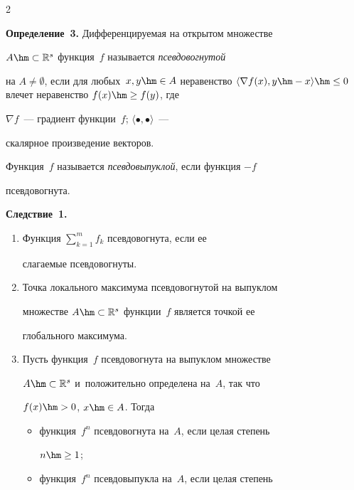 \begin{multicols}{2}
  


  \noindent


  \textbf{Определение~3.} Дифференцируемая на открытом множестве 


$A\hm\subset \mathbb{R}^s$ функция~$f$ называется \textit{псевдовогнутой} 


на $A\not= \emptyset$, если для любых~$x,y \hm\in A$ неравенство $\langle 


\nabla f(x), y\hm- x\rangle \hm\leq 0$ влечет неравенство $f(x)\hm\geq f(y)$, где 


$\nabla f$~--- градиент функции~$f$; $\langle \bullet,\bullet\rangle$~--- 


скалярное произведение векторов.


  


  Функция~$f$ называется \textit{псевдовыпуклой}, если функция $-f$ 


псевдовогнута.


  \smallskip


  


  \noindent


  \textbf{Следствие~1.} 


  \begin{enumerate}[1.]


  \item  Функция $\sum\nolimits_{k=1}^m f_k$ псевдовогнута, если ее 


слагаемые псевдовогнуты.


  \item  Точка локального максимума псевдовогнутой на выпуклом 


множестве $A\hm\subset \mathbb{R}^s$ функции~$f$ является точкой ее 


глобального максимума.


  \item Пусть функция~$f$ псевдовогнута на выпуклом множестве 


$A\hm\subset \mathbb{R}^s$ и~положительно определена на~$A$, так что 


$f(x)\hm>0$, $x\hm\in A$. Тогда


  \begin{itemize}


  \item[(а)] функция~$f^n$ псевдовогнута на~$A$, если целая степень 


$n\hm\geq 1$;


  \item[(б)] функция~$f^n$ псевдовыпукла на~$A$, если целая степень 



\end{itemize}
\end{enumerate}
\end{multicols}
